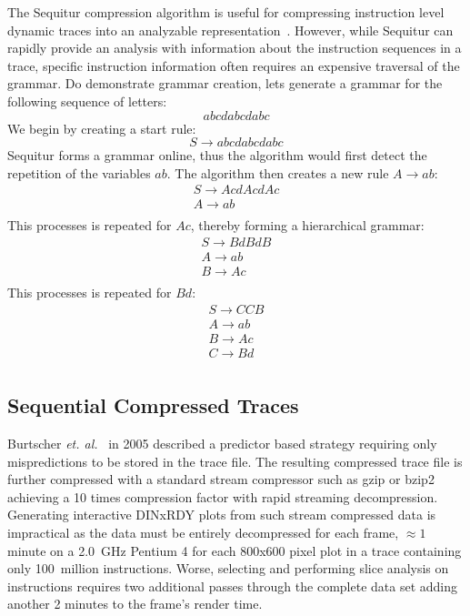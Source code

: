 \documentclass[defaultstyle,11pt]{thesis}
\begin{document}
The Sequitur compression algorithm is useful for compressing
instruction level dynamic traces into an analyzable
representation~\cite{manning:97:dcc}.  However, while Sequitur can
rapidly provide an analysis with information about the instruction
sequences in a trace, specific instruction information often requires
an expensive traversal of the grammar.  Do demonstrate grammar
creation, lets generate a grammar for the following sequence of
letters:
$$
abcdabcdabc
$$
We begin by creating a start rule:
$$
S \rightarrow abcdabcdabc
$$
Sequitur forms a grammar online, thus the algorithm would first detect the repetition of the variables $ab$.  The algorithm then creates a new rule $A \rightarrow ab$:
$$
\begin{array}{lcll}
S \rightarrow AcdAcdAc\\
A \rightarrow ab\\
\end{array}
$$
This processes is repeated for $Ac$, thereby forming a hierarchical grammar:
$$
\begin{array}{lcll}
S \rightarrow BdBdB\\
A \rightarrow ab\\
B \rightarrow Ac\\
\end{array}
$$
This processes is repeated for $Bd$:
$$
\begin{array}{lcll}
S \rightarrow CCB\\
A \rightarrow ab\\
B \rightarrow Ac\\
C \rightarrow Bd\\
\end{array}
$$

\subsection{Sequential Compressed Traces}

Burtscher \textit{et. al.}~\cite{burtscher:05:cgo} in 2005 described a predictor
based strategy requiring only mispredictions to be stored in the trace
file. The resulting compressed trace file is further compressed with a
standard stream compressor such as gzip or bzip2 achieving a 10 times
compression factor with rapid streaming decompression. Generating
interactive DINxRDY plots from such stream compressed data is
impractical as the data must be entirely decompressed for each frame,
$\approx 1$ minute on a 2.0~GHz Pentium 4 for each 800x600 pixel
plot in a trace containing only 100~million instructions.  Worse,
selecting and performing slice analysis on instructions requires two
additional passes through the complete data set adding another 2
minutes to the frame's render time.
\end{document}
